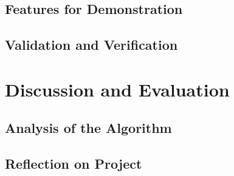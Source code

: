 \section{Features for Demonstration}

\section{Validation and Verification}

\chapter{Discussion and Evaluation}
\section{Analysis of the Algorithm}

\section{Reflection on Project}

